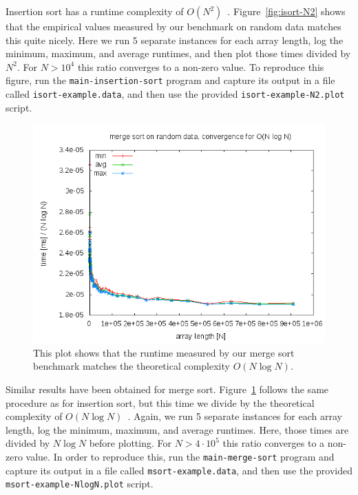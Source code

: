 \documentclass[a4paper,10pt]{article}
\begin{document}
Insertion sort has a runtime complexity of $O(N^2)$~\cite{wikipedia:insertion-sort}.
Figure~\ref{fig:isort-N2} shows that the empirical values measured by our benchmark on random data matches this quite nicely.
Here we run 5 separate instances for each array length, log the minimum, maximum, and average runtimes, and then plot those times divided by $N^2$.
For $N>10^4$ this ratio converges to a non-zero value.
To reproduce this figure, run the \texttt{main-insertion-sort} program and capture its output in a file called \texttt{isort-example.data}, and then use the provided \texttt{isort-example-N2.plot} script.

\begin{figure}
  \centering
  \includegraphics[width=0.8\columnwidth]{../examples/msort-example-NlogN.png}
  \caption{
    This plot shows that the runtime measured by our merge sort benchmark matches the theoretical complexity $O(N\log N)$.
  }\label{fig:msort-NlogN}
\end{figure}

Similar results have been obtained for merge sort.
Figure~\ref{fig:msort-NlogN} follows the same procedure as for insertion sort, but this time we divide by the theoretical complexity of $O(N\log N)$~\cite{wikipedia:merge-sort}.
Again, we run 5 separate instances for each array length, log the minimum, maximum, and average runtimes.
Here, those times are divided by $N\log N$ before plotting.
For $N>4\cdot10^5$ this ratio converges to a non-zero value.
In order to reproduce this, run the \texttt{main-merge-sort} program and capture its output in a file called \texttt{msort-example.data}, and then use the provided \texttt{msort-example-NlogN.plot} script.
\end{document}
